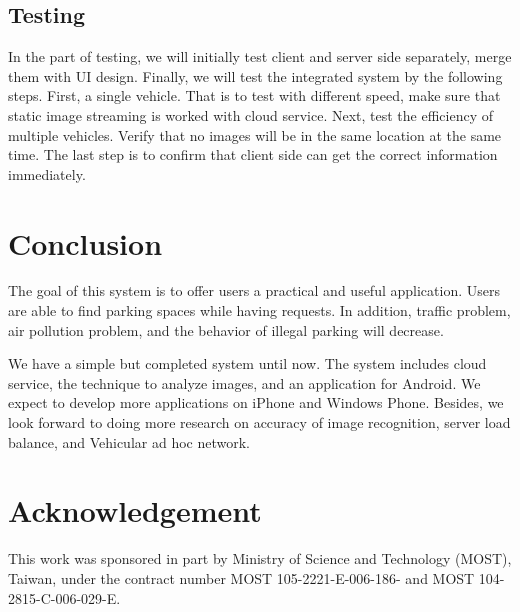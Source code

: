 \documentclass[runningheads,a4paper]{llncs}
\begin{document}
\subsection{Testing}

In the part of testing, we will initially test client and server side
separately, merge them with UI design. Finally, we will test
the integrated system by the following steps. First, a single vehicle.
That is to test with different speed, make sure that static image
streaming is worked with cloud service. Next, test the efficiency of
multiple vehicles. Verify that no images will be in the same
location at the same time. The last step is to confirm that client side
can get the correct information immediately.

\section{Conclusion}\label{sec:conclusion}

The goal of this system is to offer users a practical and useful
application. Users are able to find parking spaces while having
requests. In addition, traffic problem, air pollution problem, and the
behavior of illegal parking will decrease.

We have a simple but completed system until now. The system includes
cloud service, the technique to analyze images, and an application for
Android. We expect to develop more applications on iPhone and Windows
Phone. Besides, we look forward to doing more research on accuracy of
image recognition, server load balance, and Vehicular ad hoc network.

\section{Acknowledgement}\label{sec:ack}

This work was sponsored in part by Ministry of Science and Technology
(MOST), Taiwan, under the contract number MOST 105-2221-E-006-186- and
MOST 104-2815-C-006-029-E.




\end{document}
